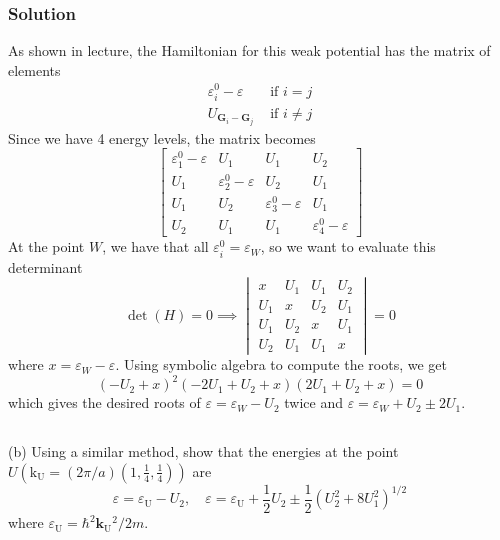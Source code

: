 \documentclass[12pt]{article}
\begin{document}
\subsubsection{Solution}
As shown in lecture, the Hamiltonian for this weak potential has the matrix of elements
\begin{align}
    \varepsilon_i^0 - \varepsilon & \text{ if } i = j \\
    U_{\mathbf{G}_i - \mathbf{G}_j} & \text{ if } i \neq j
\end{align}
Since we have 4 energy levels, the matrix becomes
\begin{equation}
    \begin{bmatrix}
        \varepsilon_1^0 - \varepsilon & U_1 & U_1 & U_2 \\
        U_1 & \varepsilon_2^0 - \varepsilon & U_2 & U_1 \\
        U_1 & U_2 & \varepsilon_3^0 - \varepsilon & U_1 \\
        U_2 & U_1 & U_1 & \varepsilon_4^0 - \varepsilon
    \end{bmatrix}
\end{equation}
At the point $W$, we have that all $\varepsilon_i^0 = \varepsilon_W$, so we want to evaluate this determinant
\begin{equation}
\det(H) = 0 \implies \begin{vmatrix}
        x & U_1 & U_1 & U_2 \\
        U_1 & x & U_2 & U_1 \\
        U_1 & U_2 & x & U_1 \\
        U_2 & U_1 & U_1 & x
    \end{vmatrix} = 0
\end{equation}
where $x = \varepsilon_W - \varepsilon$. Using symbolic algebra to compute the roots, we get
\begin{equation}
    \left(- U_{2} + x\right)^{2} \left(- 2 U_{1} + U_{2} + x\right) \left(2 U_{1} + U_{2} + x\right) = 0
\end{equation}
which gives the desired roots of $\varepsilon = \varepsilon_W - U_2$ twice and $\varepsilon = \varepsilon_W + U_2 \pm 2U_1$.
\subsection{}
(b) Using a similar method, show that the energies at the point $U\left(\mathrm{k}_{\mathrm{U}}=(2 \pi / a)\left(1, \frac{1}{4}, \frac{1}{4}\right)\right)$ are
$$
\varepsilon=\varepsilon_{\mathrm{U}}-U_2, \quad \varepsilon=\varepsilon_{\mathrm{U}}+\frac{1}{2} U_2 \pm \frac{1}{2}\left(U_2^2+8 U_1^2\right)^{1 / 2}
$$
where $\varepsilon_{\mathrm{U}}=\hbar^2 \mathbf{k}_{\mathrm{U}}{ }^2 / 2 m$.
\end{document}
